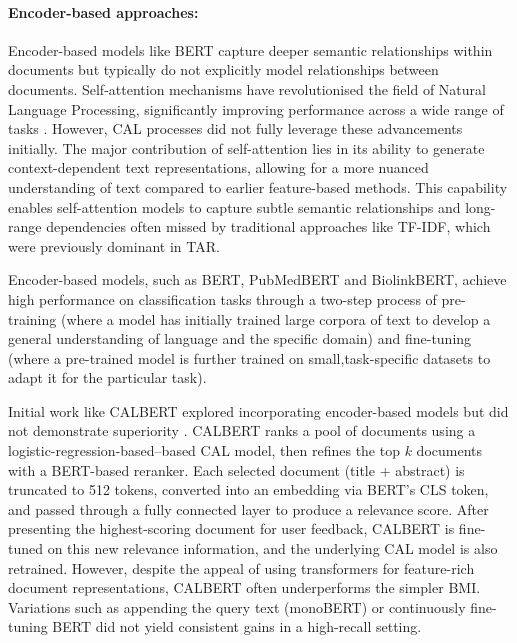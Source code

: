 \documentclass[10pt,oneside]{book}
\begin{document}
\paragraph{Encoder-based approaches: }

Encoder-based models like BERT capture deeper semantic relationships within documents but typically do not explicitly model relationships between documents. Self-attention mechanisms have revolutionised the field of Natural Language Processing, significantly improving performance across a wide range of tasks \cite{vaswani_attention_2023}. However, CAL processes did not fully leverage these advancements initially. The major contribution of self-attention lies in its ability to generate context-dependent text representations, allowing for a more nuanced understanding of text compared to earlier feature-based methods. This capability enables self-attention models to capture subtle semantic relationships and long-range dependencies often missed by traditional approaches like TF-IDF, which were previously dominant in TAR.

Encoder-based models, such as BERT, PubMedBERT and BiolinkBERT, achieve high performance on classification tasks through a two-step process of pre-training (where a model has initially trained large corpora of text to develop a general understanding of language and the specific domain) and fine-tuning (where a pre-trained model is further trained on small,task-specific datasets to adapt it for the particular task). 

Initial work like CALBERT explored incorporating encoder-based models but did not demonstrate superiority \cite{sadri_continuous_2022}. CALBERT ranks a pool of documents using a logistic-regression-based–based CAL model, then refines the top $k$ documents with a BERT-based reranker. Each selected document (title + abstract) is truncated to 512 tokens, converted into an embedding via BERT's CLS token, and passed through a fully connected layer to produce a relevance score. After presenting the highest-scoring document for user feedback, CALBERT is fine-tuned on this new relevance information, and the underlying CAL model is also retrained. However, despite the appeal of using transformers for feature-rich document representations, CALBERT often underperforms the simpler BMI. Variations such as appending the query text (monoBERT) or continuously fine-tuning BERT did not yield consistent gains in a high-recall setting. 
\end{document}
